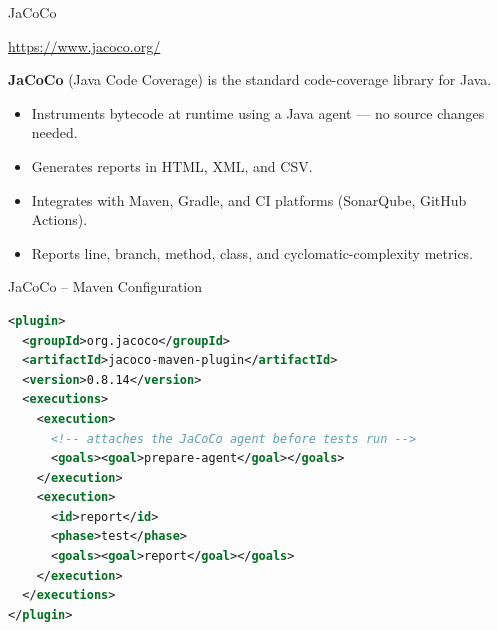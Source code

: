\documentclass[11pt, xcolor=svgnames]{beamer}
\providecommand{\alert}[1]{\textbf{#1}}
\begin{document}

\begin{frame}{JaCoCo}

\begin{block}{}
  \centering \url{https://www.jacoco.org/}
\end{block}

\alert{JaCoCo} (Java Code Coverage) is the standard code-coverage library for Java.

\begin{itemize}
  \item Instruments bytecode at runtime using a Java agent --- no source changes needed.
  \item Generates reports in HTML, XML, and CSV.
  \item Integrates with Maven, Gradle, and CI platforms (SonarQube, GitHub Actions).
  \item Reports line, branch, method, class, and cyclomatic-complexity metrics.
\end{itemize}

\end{frame}


\begin{frame}[fragile]{JaCoCo -- Maven Configuration}

\begin{lstlisting}[language=XML,basicstyle=\tiny]
<plugin>
  <groupId>org.jacoco</groupId>
  <artifactId>jacoco-maven-plugin</artifactId>
  <version>0.8.14</version>
  <executions>
    <execution>
      <!-- attaches the JaCoCo agent before tests run -->
      <goals><goal>prepare-agent</goal></goals>
    </execution>
    <execution>
      <id>report</id>
      <phase>test</phase>
      <goals><goal>report</goal></goals>
    </execution>
  </executions>
</plugin>
\end{lstlisting}

\end{frame}

\end{document}
